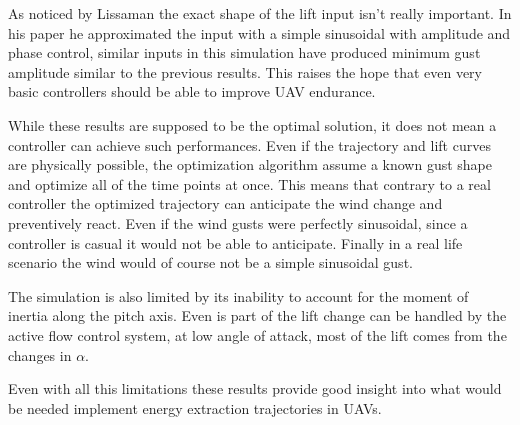 
As noticed by Lissaman the exact shape of the lift input isn't really important.
In his paper he approximated the input with a simple sinusoidal with amplitude and phase control, similar inputs in this simulation have produced minimum gust amplitude similar to the previous results.
This raises the hope that even very basic controllers should be able to improve UAV endurance.


\par While these results are supposed to be the optimal solution, it does not mean a controller can achieve such performances.
Even if the trajectory and lift curves are physically possible, the optimization algorithm assume a known gust shape and optimize all of the time points at once.
This means that contrary to a real controller the optimized trajectory can anticipate the wind change and preventively react.
Even if the wind gusts were perfectly sinusoidal, since a controller is casual it would not be able to anticipate.
Finally in a real life scenario the wind would of course not be a simple sinusoidal gust.

\par The simulation is also limited by its inability to account for the moment of inertia along the pitch axis.
Even is part of the lift change can be handled by the active flow control system, at low angle of attack, most of the lift comes from the changes in $\alpha$.

\par Even with all this limitations these results provide good insight into what would be needed implement energy extraction trajectories in UAVs.


